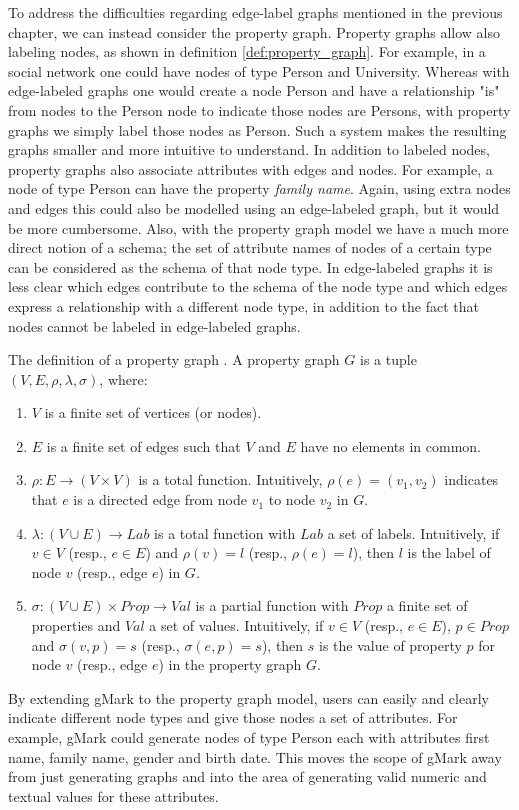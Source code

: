 To address the difficulties regarding edge-label graphs mentioned in the previous chapter, we can instead consider the property graph. Property graphs allow also labeling nodes, as shown in definition \ref{def:property_graph}. For example, in a social network one could have nodes of type Person and University. Whereas with edge-labeled graphs one would create a node Person and have a relationship "is" from nodes to the Person node to indicate those nodes are Persons, with property graphs we simply label those nodes as Person. Such a system makes the resulting graphs smaller and more intuitive to understand. In addition to labeled nodes, property graphs also associate attributes with edges and nodes. For example, a node of type Person can have the property \textit{family name}. Again, using extra nodes and edges this could also be modelled using an edge-labeled graph, but it would be more cumbersome. Also, with the property graph model we have a much more direct notion of a schema; the set of attribute names of nodes of a certain type can be considered as the schema of that node type. In edge-labeled graphs it is less clear which edges contribute to the schema of the node type and which edges express a relationship with a different node type, in addition to the fact that nodes cannot be labeled in edge-labeled graphs.

\begin{defn}
The definition of a property graph \cite{2017ADatabases}. A property graph $G$ is a tuple $(V, E, \rho, \lambda, \sigma)$, where:
    \begin{enumerate}
      \item $V$ is a finite set of vertices (or nodes).
      \item $E$ is a finite set of edges such that $V$ and $E$ have no elements in common.
      \item $\rho: E \rightarrow (V \times V)$ is a total function. Intuitively, $\rho(e) = (v_1, v_2)$ indicates that $e$ is a directed edge from node $v_1$ to node $v_2$ in $G$.
      \item $\lambda: (V \cup E) \rightarrow Lab$ is a total function with $Lab$ a set of labels. Intuitively, if $v \in V$ (resp., $e \in E$) and $\rho (v) = l$ (resp., $\rho (e) = l$), then $l$ is the label of node $v$ (resp., edge $e$) in $G$.
      \item $\sigma: (V \cup E) \times Prop \rightarrow Val$ is a partial function with $Prop$ a finite set of properties and $Val$ a set of values. Intuitively, if $v \in V$ (resp., $e \in E$), $p \in Prop$ and $\sigma (v,p) = s$ (resp., $\sigma (e,p) = s$), then $s$ is the value of property $p$ for node $v$ (resp., edge $e$) in the property graph $G$.
    \end{enumerate}
    \label{def:property_graph}
\end{defn}

By extending gMark to the property graph model, users can easily and clearly indicate different node types and give those nodes a set of attributes. For example, gMark could generate nodes of type Person each with attributes first name, family name, gender and birth date. This moves the scope of gMark away from just generating graphs and into the area of generating valid numeric and textual values for these attributes.